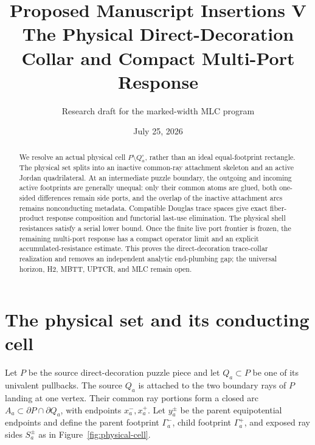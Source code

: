 \documentclass[11pt]{article}
\title{Proposed Manuscript Insertions V\\
The Physical Direct-Decoration Collar and Compact Multi-Port Response}
\author{Research draft for the marked-width MLC program}
\date{July 25, 2026}
\theoremstyle{definition}
\theoremstyle{remark}
\begin{document}
\maketitle

\begin{abstract}
We resolve an actual physical cell $P\setminus Q_a^\circ$, rather than an
ideal equal-footprint rectangle.  The physical set splits into an inactive
common-ray attachment skeleton and an active Jordan quadrilateral.  At an
intermediate puzzle boundary, the outgoing and incoming active footprints are
generally unequal: only their common atoms are glued, both one-sided differences
remain side ports, and the overlap of the inactive attachment arcs remains
nonconducting metadata.  Compatible Douglas trace spaces give exact
fiber-product response composition and functorial last-use elimination.  The
physical shell resistances satisfy a serial lower bound.  Once the finite live
port frontier is frozen, the remaining multi-port response has a compact
operator limit and an explicit accumulated-resistance estimate.  This proves the
direct-decoration trace-collar realization and removes an independent analytic
end-plumbing gap; the universal horizon, H2, MBTT, UPTCR, and MLC remain open.
\end{abstract}

\section{The physical set and its conducting cell}

Let $P$ be the source direct-decoration puzzle piece and let $Q_a\subset P$ be
one of its univalent pullbacks.  The source $Q_a$ is attached to the two boundary
rays of $P$ landing at one vertex.  Their common ray portions form a closed arc
$A_a\subset\partial P\cap\partial Q_a$, with endpoints $x_a^-,x_a^+$.
Let $y_a^\pm$ be the parent equipotential endpoints and define the parent
footprint $\Gamma_a^-$, child footprint $\Gamma_a^+$, and exposed ray sides
$S_a^\pm$ as in Figure~\ref{fig:physical-cell}.
\end{document}
